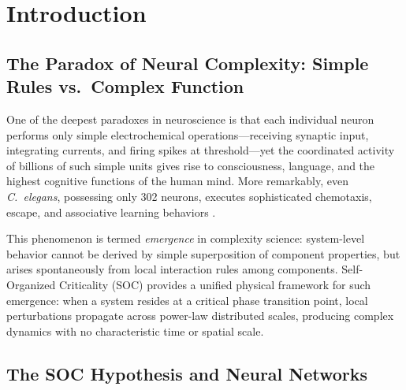 \documentclass[12pt,a4paper]{article}
\begin{document}
\begin{abstract}
This work provides systematic computational evidence---spanning synthetic networks to real biological connectomes---for the \textbf{TCC (Topology-Centric Computing)} paradigm, supporting the core belief that minimal rule sets, through energy interaction with the environment, can spontaneously give rise to neural system-level complex functionality with self-organized criticality enabling optimal information processing.

\medskip\noindent\textbf{Keywords:} Self-organized criticality, small-world networks, STDP, synaptic pruning, neuromorphic computing, Hemibrain connectome, topology-centric computing
\end{abstract}

\section{Introduction}

\subsection{The Paradox of Neural Complexity: Simple Rules vs.\ Complex Function}

One of the deepest paradoxes in neuroscience is that each individual neuron performs only simple electrochemical operations---receiving synaptic input, integrating currents, and firing spikes at threshold---yet the coordinated activity of billions of such simple units gives rise to consciousness, language, and the highest cognitive functions of the human mind. More remarkably, even \textit{C.\ elegans}, possessing only 302 neurons, executes sophisticated chemotaxis, escape, and associative learning behaviors \citep{varshney2011}.

This phenomenon is termed \emph{emergence} in complexity science: system-level behavior cannot be derived by simple superposition of component properties, but arises spontaneously from local interaction rules among components. Self-Organized Criticality (SOC) \citep{bak1987} provides a unified physical framework for such emergence: when a system resides at a critical phase transition point, local perturbations propagate across power-law distributed scales, producing complex dynamics with no characteristic time or spatial scale.

\subsection{The SOC Hypothesis and Neural Networks}
\end{document}
